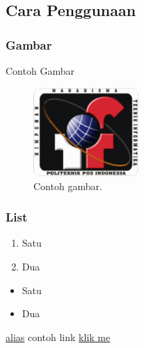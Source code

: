 \subsection{Cara Penggunaan}
\subsubsection{Gambar}

\hfill\break

Contoh Gambar
\begin{figure}[H]
	\includegraphics[width=4cm]{figures/himatif.png}
	\centering
	\caption{Contoh gambar.}
\end{figure}

\subsubsection{List}
\begin{enumerate}
	\item Satu
	\item Dua
\end{enumerate}

\begin{itemize}
	\item Satu
	\item Dua
\end{itemize}

\href{link kamu}{alias}
contoh link
\href{https://www.google.com/}{klik me}